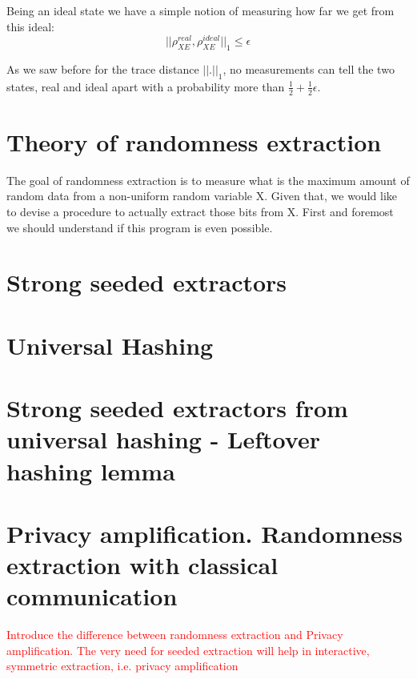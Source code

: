Being an ideal state we have a simple notion of measuring how far we get from this ideal:
\begin{equation}
	||\rho^{real}_{XE}, \rho^{ideal}_{XE}||_1 \le \epsilon
\end{equation}

As we saw before for the trace distance $||.||_1$, no measurements can tell the two states, real and ideal apart with a probability more than $\frac{1}{2} +\frac{1}{2}\epsilon$.

\section{Theory of randomness extraction}

The goal of randomness extraction is to measure what is the maximum amount of random data from a non-uniform random variable X. Given that, we would like to devise a procedure to actually extract those bits from X. 
First and foremost we should understand if this program is even possible. 

\section{Strong seeded extractors}

\section{Universal Hashing}

\section{Strong seeded extractors from universal hashing - Leftover hashing lemma}

 

\section{Privacy amplification. Randomness extraction with classical communication}

\textcolor{red}{Introduce the difference between randomness extraction and Privacy amplification. The very need for seeded extraction will help in interactive, symmetric extraction, i.e. privacy amplification} 




\section{}
